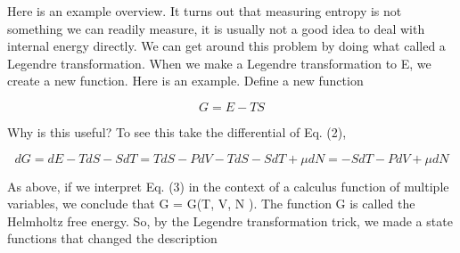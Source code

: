 Here is an example overview. It turns out that measuring entropy is not something we can readily measure, it is usually
not a good idea to deal with internal energy directly. We can get around this problem by
doing what called a Legendre transformation. When we make a Legendre transformation to
E, we create a new function. Here is an example. Define a new function

$$G = E -TS $$

Why is this useful? To see this take the differential of Eq. (2),

$$dG = dE - TdS - SdT = TdS - PdV - TdS -SdT +\mu dN = -SdT -PdV +\mu dN $$

As above, if we interpret Eq. (3) in the context of a calculus function of multiple variables,
we conclude that G = G(T, V, N ). The function G is called the Helmholtz free energy. So, by
the Legendre transformation trick, we made a state functions that changed the description